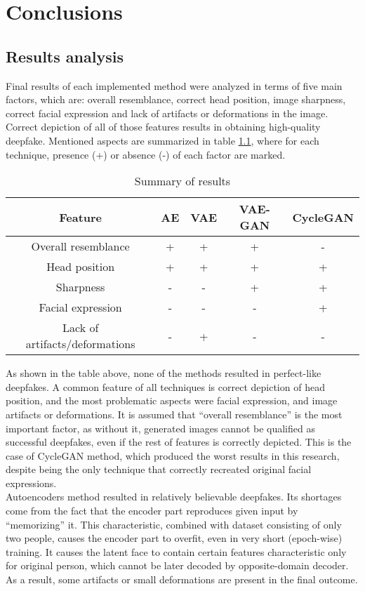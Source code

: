 \chapter{Conclusions}
\label{Conclusions}
\section{Results analysis}
Final results of each implemented method were analyzed in terms of five main factors, which are: overall resemblance, correct head position, image sharpness, correct facial expression and lack of artifacts or deformations in the image. Correct depiction of all of those features results in obtaining high-quality deepfake. Mentioned aspects are summarized in table \ref{tab:summary_of_results}, where for each technique, presence (+) or absence (-) of each factor are marked.

\begin{table}[H]
\centering
\begin{tabular}[c]{|c|c|c|c|c|} \hline
\textbf{Feature} & \textbf{AE} & \textbf{VAE} & \textbf{VAE-GAN} & \textbf{CycleGAN}\\ \hline
Overall resemblance & + & + & + & -\\ \hline
Head position & + & + & + & +\\ \hline
Sharpness & - & - & + & +\\ \hline
Facial expression & - & - & - & +\\ \hline
Lack of artifacts/deformations & - & + & - & -\\ \hline
\end{tabular}
\caption{Summary of results}
\label{tab:summary_of_results}
\end{table}

As shown in the table above, none of the methods resulted in perfect-like deepfakes. A common feature of all techniques is correct depiction of head position, and the most problematic aspects were facial expression, and image artifacts or deformations. It is assumed that ``overall resemblance'' is the most important factor, as without it, generated images cannot be qualified as successful deepfakes, even if the rest of features is correctly depicted. This is the case of CycleGAN method, which produced the worst results in this research, despite being the only technique that correctly recreated original facial expressions.\\

Autoencoders method resulted in relatively believable deepfakes. Its shortages come from the fact that the encoder part reproduces given input by ``memorizing'' it. This characteristic, combined with dataset consisting of only two people, causes the encoder part to overfit, even in very short (epoch-wise) training. It causes the latent face to contain certain features characteristic only for original person, which cannot be later decoded by opposite-domain decoder. As a result, some artifacts or small deformations are present in the final outcome.\\


